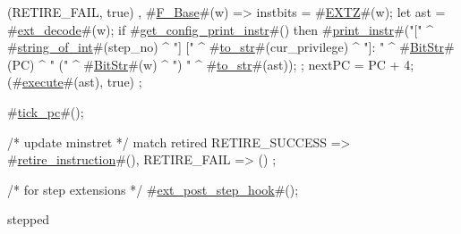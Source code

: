 {{{{{{              (RETIRE_FAIL, true)
             }
          },
          #\hyperref[sailRISCVzFzyBase]{F\_Base}#(w) => {
            instbits = #\hyperref[sailRISCVzEXTZ]{EXTZ}#(w);
            let ast = #\hyperref[sailRISCVzextzydecode]{ext\_decode}#(w);
            if   #\hyperref[sailRISCVzgetzyconfigzyprintzyinstr]{get\_config\_print\_instr}#()
            then {
              #\hyperref[sailRISCVzprintzyinstr]{print\_instr}#("[" ^ #\hyperref[sailRISCVzstringzyofzyint]{string\_of\_int}#(step_no) ^ "] [" ^ #\hyperref[sailRISCVztozystr]{to\_str}#(cur_privilege) ^ "]: " ^ #\hyperref[sailRISCVzBitStr]{BitStr}#(PC) ^ " (" ^ #\hyperref[sailRISCVzBitStr]{BitStr}#(w) ^ ") " ^ #\hyperref[sailRISCVztozystr]{to\_str}#(ast));
            };
            nextPC = PC + 4;
            (#\hyperref[sailRISCVzexecute]{execute}#(ast), true)
          }
        }
      }
    };

  #\hyperref[sailRISCVztickzypc]{tick\_pc}#();

  /* update minstret */
  match retired {
    RETIRE_SUCCESS => #\hyperref[sailRISCVzretirezyinstruction]{retire\_instruction}#(),
    RETIRE_FAIL    => ()
  };

  /* for step extensions */
  #\hyperref[sailRISCVzextzypostzystepzyhook]{ext\_post\_step\_hook}#();

  stepped
}
